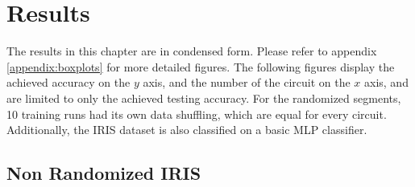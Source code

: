 
\chapter{Results} %

\label{chapter:results}

The results in this chapter are in condensed form. Please refer to appendix \ref{appendix:boxplots} for more detailed figures. The following figures display the achieved accuracy on the $y$ axis, and the number of the circuit on the $x$ axis, and are limited to only the achieved testing accuracy. For the randomized segments, 10 training runs had its own data shuffling, which are equal for every circuit. Additionally, the IRIS dataset is also classified on a basic MLP classifier.
\def \newboxplotwidth {215pt}


\clearpage
\section{Non Randomized IRIS}
\label{chapter:iris_non_randomized}

